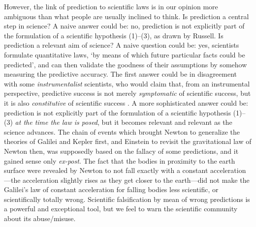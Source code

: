 \documentclass{statsoc}
\begin{document}
However, the link of prediction to scientific laws is in our opinion more ambiguous than what people are usually inclined to think. Is prediction a central step in science? A naive 
answer could be: no, prediction is not explicitly part of the formulation of a scientific hypothesis (1)--(3), as drawn by Russell. Is prediction a relevant aim of science? A naive 
question could be: yes, scientists formulate quantitative laws, `by means of which future particular facts could be
predicted', and can then validate the goodness of their assumptions by somehow  measuring the predictive accuracy. The first answer could be in disagreement with some 
\emph{instrumentalist} scientists, who would claim that, from an instrumental perspective, predictive success is not merely \emph{symptomatic} of scientific success, but it is also 
\emph{constitutive} of scientific success \citep{hitchcock2004prediction}. A more sophisticated answer could be:  prediction is not explicitly part of the formulation of a 
scientific hypothesis (1)--(3) \emph{at the time the law is posed}, but it becomes relevant and relevant as the science advances. The chain of events which brought Newton to 
generalize the theories of Galilei and Kepler first, and Einstein to revisit the gravitational law of Newton then, was supposedly based on the fallacy of some predictions, and it gained sense 
only \emph{ex-post}. The fact that the bodies in proximity to the earth surface were revealed by Newton to not fall exactly with a constant acceleration---the acceleration slightly 
rises as they get closer to the earth---did not make the Galilei's law of constant acceleration for falling bodies less scientific, or scientifically totally wrong. Scientific falsification by mean of wrong predictions \citep{popper2005logic} is a powerful and exceptional tool, but we feel to warn the scientific community about its abuse/misuse. 
\end{document}
